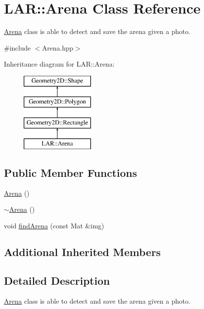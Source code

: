 \hypertarget{class_l_a_r_1_1_arena}{}\section{L\+AR\+:\+:Arena Class Reference}
\label{class_l_a_r_1_1_arena}


\mbox{\hyperlink{class_l_a_r_1_1_arena}{Arena}} class is able to detect and save the arena given a photo.  




{\ttfamily \#include $<$Arena.\+hpp$>$}

Inheritance diagram for L\+AR\+:\+:Arena\+:\begin{figure}[H]
\begin{center}
\leavevmode
\includegraphics[height=4.000000cm]{class_l_a_r_1_1_arena}
\end{center}
\end{figure}
\subsection*{Public Member Functions}
\begin{DoxyCompactItemize}
\item 
\mbox{\hyperlink{class_l_a_r_1_1_arena_aab5beeb938591f801c712269787e7368}{Arena}} ()
\item 
\mbox{\hyperlink{class_l_a_r_1_1_arena_abf0ebe4fb9fd22c466c91ef7975b37fc}{$\sim$\+Arena}} ()
\item 
void \mbox{\hyperlink{class_l_a_r_1_1_arena_afea06d76528c01c7764134713c305340}{find\+Arena}} (const Mat \&img)
\end{DoxyCompactItemize}
\subsection*{Additional Inherited Members}


\subsection{Detailed Description}
\mbox{\hyperlink{class_l_a_r_1_1_arena}{Arena}} class is able to detect and save the arena given a photo. 

